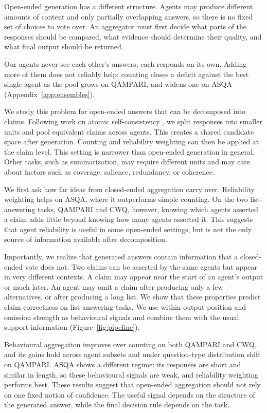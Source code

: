 \documentclass[11pt]{article}
\begin{document}
Open-ended generation has a different structure. Agents may produce different amounts of content and only partially overlapping answers, so there is no fixed set of choices to vote over. An aggregator must first decide what parts of the responses should be compared, what evidence should determine their quality, and what final output should be returned.

Our agents never see each other's answers; each responds on its own. Adding more of them does not reliably help: counting closes a deficit against the best single agent as the pool grows on QAMPARI, and widens one on ASQA (Appendix~\ref{app:ensembles}).

We study this problem for open-ended answers that can be decomposed into claims. Following work on atomic self-consistency \citep{thirukovalluru2024atomic}, we split responses into smaller units and pool equivalent claims across agents. This creates a shared candidate space after generation. Counting and reliability weighting can then be applied at the claim level. This setting is narrower than open-ended generation in general. Other tasks, such as summarization, may require different units and may care about factors such as coverage, salience, redundancy, or coherence.

We first ask how far ideas from closed-ended aggregation carry over. Reliability weighting helps on ASQA, where it outperforms simple counting. On the two list-answering tasks, QAMPARI and CWQ, however, knowing which agents asserted a claim adds little beyond knowing how many agents asserted it. This suggests that agent reliability is useful in some open-ended settings, but is not the only source of information available after decomposition.

Importantly, we realize that generated answers contain information that a closed-ended vote does not. Two claims can be asserted by the same agents but appear in very different contexts. A claim may appear near the start of an agent's output or much later. An agent may omit a claim after producing only a few alternatives, or after producing a long list. We show that these properties predict claim correctness on list-answering tasks. We use within-output position and omission strength as behavioural signals and combine them with the usual support information (Figure~\ref{fig:pipeline}).

Behavioural aggregation improves over counting on both QAMPARI and CWQ, and its gains hold across agent subsets and under question-type distribution shift on QAMPARI. ASQA shows a different regime: its responses are short and similar in length, so these behavioural signals are weak, and reliability weighting performs best. These results suggest that open-ended aggregation should not rely on one fixed notion of confidence. The useful signal depends on the structure of the generated answer, while the final decision rule depends on the task.
\end{document}
